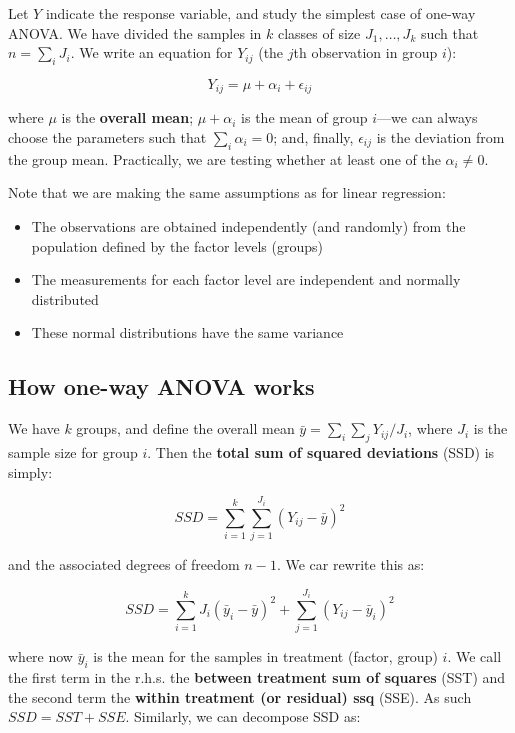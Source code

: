 \documentclass[
  letterpaper,
  DIV=11,
  numbers=noendperiod]{scrreprt}
\providecommand{\tightlist}{%
  \setlength{\itemsep}{0pt}\setlength{\parskip}{0pt}}\usepackage{longtable,booktabs,array}
\begin{document}
Let \(Y\) indicate the response variable, and study the simplest case of
one-way ANOVA. We have divided the samples in \(k\) classes of size
\(J_1, \ldots, J_k\) such that \(n=\sum_i J_i\). We write an equation
for \(Y_{ij}\) (the \(j\)th observation in group \(i\)):

\[
Y_{ij} = \mu + \alpha_i + \epsilon_{ij}
\]

where \(\mu\) is the \textbf{overall mean}; \(\mu + \alpha_i\) is the
mean of group \(i\)---we can always choose the parameters such that
\(\sum_i \alpha_i = 0\); and, finally, \(\epsilon_{ij}\) is the
deviation from the group mean. Practically, we are testing whether at
least one of the \(\alpha_i \neq 0\).

Note that we are making the same assumptions as for linear regression:

\begin{itemize}
\tightlist
\item
  The observations are obtained independently (and randomly) from the
  population defined by the factor levels (groups)
\item
  The measurements for each factor level are independent and normally
  distributed
\item
  These normal distributions have the same variance
\end{itemize}

\hypertarget{how-one-way-anova-works}{%
\subsection{How one-way ANOVA works}\label{how-one-way-anova-works}}

We have \(k\) groups, and define the overall mean
\(\bar{y} = \sum_i \sum_j Y_{ij} / J_{i}\), where \(J_i\) is the sample
size for group \(i\). Then the \textbf{total sum of squared deviations}
(SSD) is simply:

\[
SSD = \sum_{i = 1}^k \sum_{j = 1}^{J_{i}} \left(Y_{ij} - \bar{y}\right)^2
\]

and the associated degrees of freedom \(n-1\). We car rewrite this as:

\[
SSD = \sum_{i = 1}^k J_{i} \left(\bar{y}_i - \bar{y} \right)^2 + \sum_{j = 1}^{J_{i}} \left(Y_{ij} - \bar{y}_i \right)^2
\]

where now \(\bar{y}_i\) is the mean for the samples in treatment
(factor, group) \(i\). We call the first term in the r.h.s. the
\textbf{between treatment sum of squares} (SST) and the second term the
\textbf{within treatment (or residual) ssq} (SSE). As such
\(SSD = SST + SSE\). Similarly, we can decompose SSD as:
\end{document}
